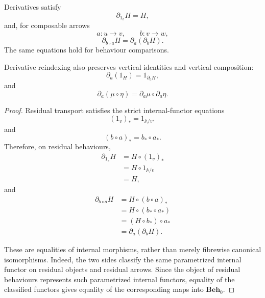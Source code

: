 \begin{proposition}
\label{prop:derivative-laws-behaviour-category}
    Derivatives satisfy
    \[
        \partial_{1_v}H=H,
    \]
    and, for composable arrows
    \[
        a:u\to v,
        \qquad
        b:v\to w,
    \]
    \[
        \partial_{b\circ a}H
        =
        \partial_a(\partial_bH).
    \]
    The same equations hold for behaviour comparisons.

    Derivative reindexing also preserves vertical identities and vertical
    composition:
    \[
        \partial_a(1_H)
        =
        1_{\partial_aH},
    \]
    and
    \[
        \partial_a(\mu\circ\eta)
        =
        \partial_a\mu\circ\partial_a\eta.
    \]
\end{proposition}
\begin{proof}
    Residual transport satisfies the strict internal-functor equations
    \[
        (1_v)_*
        =
        1_{\mathbb A/v},
    \]
    and
    \[
        (b\circ a)_*
        =
        b_*\circ a_*.
    \]
    Therefore, on residual behaviours,
    \[
        \begin{aligned}
            \partial_{1_v}H
            &=
            H\circ(1_v)_*
            \\
            &=
            H\circ1_{\mathbb A/v}
            \\
            &=
            H,
        \end{aligned}
    \]
    and
    \[
        \begin{aligned}
            \partial_{b\circ a}H
            &=
            H\circ(b\circ a)_*
            \\
            &=
            H\circ(b_*\circ a_*)
            \\
            &=
            (H\circ b_*)\circ a_*
            \\
            &=
            \partial_a(\partial_bH).
        \end{aligned}
    \]

    These are equalities of internal morphisms, rather than merely
    fibrewise canonical isomorphisms. Indeed, the two sides classify the
    same parametrized internal functor on residual objects and residual
    arrows. Since the object of residual behaviours represents such
    parametrized internal functors, equality of the classified functors
    gives equality of the corresponding maps into
    \(\mathbf{Beh}_0\).


\end{proof}
